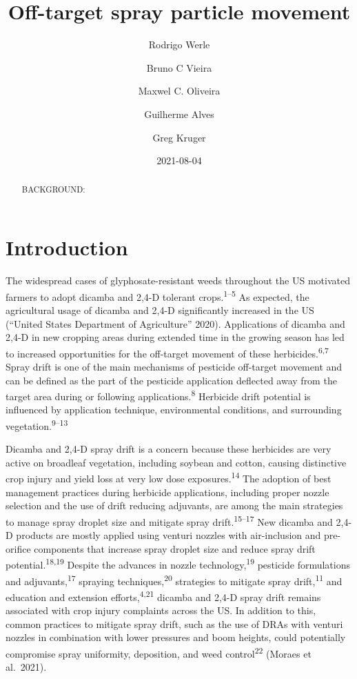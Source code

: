 \documentclass[
  12pt,
  a4paper,
]{article}
\title{Off-target spray particle movement}
\author{Rodrigo Werle \and Bruno C Vieira \and Maxwel C.
Oliveira \and Guilherme Alves \and Greg Kruger}
\date{2021-08-04}
\begin{document}
\maketitle
\begin{abstract}
BACKGROUND:
\end{abstract}

\hypertarget{introduction}{%
\section{Introduction}\label{introduction}}

The widespread cases of glyphosate-resistant weeds throughout the US
motivated farmers to adopt dicamba and 2,4-D tolerant
crops.\textsuperscript{1--5} As expected, the agricultural usage of
dicamba and 2,4-D significantly increased in the US (``United States
Department of Agriculture'' 2020). Applications of dicamba and 2,4-D in
new cropping areas during extended time in the growing season has led to
increased opportunities for the off-target movement of these
herbicides.\textsuperscript{6,7} Spray drift is one of the main
mechanisms of pesticide off-target movement and can be defined as the
part of the pesticide application deflected away from the target area
during or following applications.\textsuperscript{8} Herbicide drift
potential is influenced by application technique, environmental
conditions, and surrounding vegetation.\textsuperscript{9--13}

Dicamba and 2,4-D spray drift is a concern because these herbicides are
very active on broadleaf vegetation, including soybean and cotton,
causing distinctive crop injury and yield loss at very low dose
exposures.\textsuperscript{14} The adoption of best management practices
during herbicide applications, including proper nozzle selection and the
use of drift reducing adjuvants, are among the main strategies to manage
spray droplet size and mitigate spray drift.\textsuperscript{15--17} New
dicamba and 2,4-D products are mostly applied using venturi nozzles with
air-inclusion and pre-orifice components that increase spray droplet
size and reduce spray drift potential.\textsuperscript{18,19} Despite
the advances in nozzle technology,\textsuperscript{19} pesticide
formulations and adjuvants,\textsuperscript{17} spraying
techniques,\textsuperscript{20} strategies to mitigate spray
drift,\textsuperscript{11} and education and extension
efforts,\textsuperscript{4,21} dicamba and 2,4-D spray drift remains
associated with crop injury complaints across the US. In addition to
this, common practices to mitigate spray drift, such as the use of DRAs
with venturi nozzles in combination with lower pressures and boom
heights, could potentially compromise spray uniformity, deposition, and
weed control\textsuperscript{22} (Moraes et al.~2021).
\end{document}
